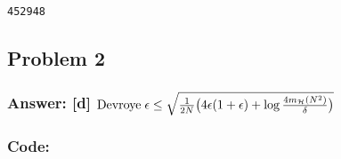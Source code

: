 \documentclass[11pt]{article}
\makeatletter
\newcommand{\boxspacing}{\kern\kvtcb@left@rule\kern\kvtcb@boxsep}
\newcommand{\prompt}[4]{
        \ttfamily\llap{{\color{#2}[#3]:\hspace{3pt}#4}}\vspace{-\baselineskip}
    }
\makeatother
\begin{document}
            \begin{tcolorbox}[breakable, size=fbox, boxrule=.5pt, pad at break*=1mm, opacityfill=0]
\prompt{Out}{outcolor}{73}{\boxspacing}
\begin{Verbatim}[commandchars=\\\{\}]
452948
\end{Verbatim}
\end{tcolorbox}
        
    \hypertarget{problem-2}{%
\subsection{Problem 2}\label{problem-2}}

\hypertarget{answer-d-rm-devroye-epsilon-le-sqrtfrac12nbig4epsilon1epsilonlogfrac4-m_mathcalhn2deltabig}{%
\subsubsection{\texorpdfstring{Answer: {[}d{]}
\({\rm Devroye}\; \epsilon \le \sqrt{\frac{1}{2N}\big(4\epsilon(1+\epsilon)+\log{\frac{4 m_{\mathcal{H}}(N^2)}{\delta}}\big)}\)}{Answer: {[}d{]} \{\textbackslash{}rm Devroye\}\textbackslash{}; \textbackslash{}epsilon \textbackslash{}le \textbackslash{}sqrt\{\textbackslash{}frac\{1\}\{2N\}\textbackslash{}big(4\textbackslash{}epsilon(1+\textbackslash{}epsilon)+\textbackslash{}log\{\textbackslash{}frac\{4 m\_\{\textbackslash{}mathcal\{H\}\}(N\^{}2)\}\{\textbackslash{}delta\}\}\textbackslash{}big)\}}}\label{answer-d-rm-devroye-epsilon-le-sqrtfrac12nbig4epsilon1epsilonlogfrac4-m_mathcalhn2deltabig}}

\hypertarget{code}{%
\subsubsection{Code:}\label{code}}
\end{document}

